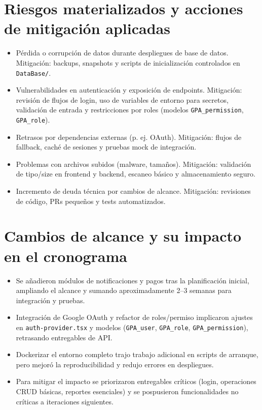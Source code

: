 \documentclass[12pt]{report}
\begin{document}
\section{Riesgos materializados y acciones de mitigación aplicadas}
\begin{itemize}
  \item Pérdida o corrupción de datos durante despliegues de base de datos. Mitigación: backups, snapshots y scripts de inicialización controlados en \texttt{DataBase/}.
  \item Vulnerabilidades en autenticación y exposición de endpoints. Mitigación: revisión de flujos de login, uso de variables de entorno para secretos, validación de entrada y restricciones por roles (modelos \texttt{GPA_permission}, \texttt{GPA_role}).
  \item Retrasos por dependencias externas (p. ej. OAuth). Mitigación: flujos de fallback, caché de sesiones y pruebas mock de integración.
  \item Problemas con archivos subidos (malware, tamaños). Mitigación: validación de tipo/size en frontend y backend, escaneo básico y almacenamiento seguro.
  \item Incremento de deuda técnica por cambios de alcance. Mitigación: revisiones de código, PRs pequeños y tests automatizados.
\end{itemize}

\section{Cambios de alcance y su impacto en el cronograma}
\begin{itemize}
  \item Se añadieron módulos de notificaciones y pagos tras la planificación inicial, ampliando el alcance y sumando aproximadamente 2–3 semanas para integración y pruebas.
  \item Integración de Google OAuth y refactor de roles/permiso implicaron ajustes en \texttt{auth-provider.tsx} y modelos (\texttt{GPA_user}, \texttt{GPA_role}, \texttt{GPA_permission}), retrasando entregables de API.
  \item Dockerizar el entorno completo trajo trabajo adicional en scripts de arranque, pero mejoró la reproducibilidad y redujo errores en despliegues.
  \item Para mitigar el impacto se priorizaron entregables críticos (login, operaciones CRUD básicas, reportes esenciales) y se pospusieron funcionalidades no críticas a iteraciones siguientes.
\end{itemize}
\end{document}
